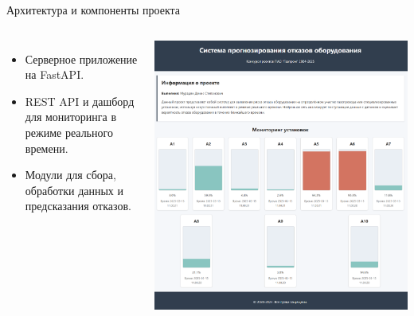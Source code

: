 \documentclass[aspectratio=169]{beamer}
\begin{document}
\begin{frame}{Архитектура и компоненты проекта}
  \begin{columns}
      \begin{itemize}
        \item Серверное приложение на FastAPI.
        \item REST API и дашборд для мониторинга в режиме реального времени.
        \item Модули для сбора, обработки данных и предсказания отказов.
      \end{itemize}
      \centering
      \includegraphics[width=\linewidth]{../../Include/dashboard.png}
  \end{columns}
\end{frame}
\end{document}
